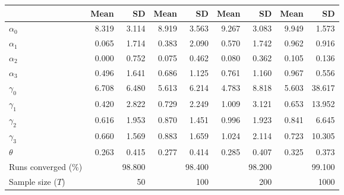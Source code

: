 
\begin{tabular}[t]{lrrrrrrrr}
\toprule
  & Mean & SD & Mean  & SD  & Mean   & SD   & Mean    & SD   \\
\midrule
$\alpha_{0}$ & 8.319 & 3.114 & 8.919 & 3.563 & 9.267 & 3.083 & 9.949 & 1.573\\
$\alpha_{1}$ & 0.065 & 1.714 & 0.383 & 2.090 & 0.570 & 1.742 & 0.962 & 0.916\\
$\alpha_{2}$ & 0.000 & 0.752 & 0.075 & 0.462 & 0.080 & 0.362 & 0.105 & 0.136\\
$\alpha_{3}$ & 0.496 & 1.641 & 0.686 & 1.125 & 0.761 & 1.160 & 0.967 & 0.556\\
$\gamma_{0}$ & 6.708 & 6.480 & 5.613 & 6.214 & 4.783 & 8.818 & 5.603 & 38.617\\
$\gamma_{1}$ & 0.420 & 2.822 & 0.729 & 2.249 & 1.009 & 3.121 & 0.653 & 13.952\\
$\gamma_{2}$ & 0.616 & 1.953 & 0.870 & 1.451 & 0.996 & 1.923 & 0.841 & 6.645\\
$\gamma_{3}$ & 0.660 & 1.569 & 0.883 & 1.659 & 1.024 & 2.114 & 0.723 & 10.305\\
$\theta$ & 0.263 & 0.415 & 0.277 & 0.414 & 0.285 & 0.407 & 0.325 & 0.373\\
Runs converged (\%) &  & 98.800 &  & 98.400 &  & 98.200 &  & 99.100\\
Sample size ($T$) &  & 50 &  & 100 &  & 200 &  & 1000\\
\bottomrule
\end{tabular}
